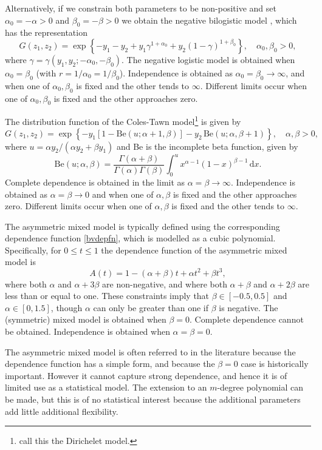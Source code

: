 \documentclass[11pt,a4paper]{article}
\begin{document}
Alternatively, if we constrain both parameters to be non-positive and set $\alpha_0=-\alpha > 0$ and $\beta_0=-\beta > 0$ we obtain the negative bilogistic model \citep{coletawn94}, which has the representation
\begin{equation*}
G(z_1,z_2) = \exp\left\{-y_1-y_2+y_1\gamma^{1+\alpha_0}+y_2(1-\gamma)^{1+\beta_0} \right\}, \quad \alpha_0,\beta_0 > 0,
\end{equation*}
where $\gamma=\gamma(y_1,y_2;-\alpha_0,-\beta_0)$.
The negative logistic model is obtained when $\alpha_0=\beta_0$ (with $r = 1/\alpha_0 = 1/\beta_0$).
Independence is obtained as $\alpha_0 = \beta_0 \rightarrow\infty$, and when one of $\alpha_0,\beta_0$ is fixed and the other tends to $\infty$.
Different limits occur when one of $\alpha_0,\beta_0$ is fixed and the other approaches zero.

The distribution function of the Coles-Tawn model\footnote{\citet{coletawn91} call this the Dirichelet model.}
\citep{coletawn91} is given by
\begin{equation*}
G(z_1,z_2) = \exp\left\{-y_1[1-\text{Be}(u;\alpha+1,\beta)] - y_2\,\text{Be}(u;\alpha,\beta+1) \right\}, \quad \alpha,\beta > 0,
\end{equation*}
where $u=\alpha y_2/(\alpha y_2+\beta y_1)$ and Be is the incomplete beta function, given by
\begin{equation*}
\text{Be}(u;\alpha,\beta) = \frac{\Gamma(\alpha+\beta)}{\Gamma(\alpha)\Gamma(\beta)} \int_0^u x^{\alpha-1}(1-x)^{\beta-1}  \, \text{d}x.
\end{equation*}
Complete dependence is obtained in the limit as $\alpha = \beta \rightarrow\infty$.
Independence is obtained as $\alpha = \beta \rightarrow0$ and when one of $\alpha,\beta$ is fixed and the other approaches zero.
Different limits occur when one of $\alpha,\beta$ is fixed and the other tends to $\infty$.

The asymmetric mixed model \citep{tawn88} is typically defined using the corresponding dependence function \eqref{bvdepfn}, which is modelled as a cubic polynomial. Specifically, for $0 \leq t \leq 1$ the dependence function of the asymmetric mixed model is 
\begin{equation*}
A(t) = 1 - (\alpha + \beta)t + \alpha t^2 + \beta t^3,
\end{equation*}
where both $\alpha$ and $\alpha + 3\beta$ are non-negative, and where both $\alpha + \beta$ and $\alpha + 2\beta$ are less than or equal to one. These constraints imply that $\beta \in [-0.5,0.5]$ and $\alpha \in [0,1.5]$, though $\alpha$ can only be greater than one if $\beta$ is negative. The (symmetric) mixed model is obtained when $\beta = 0$. Complete dependence cannot be obtained. Independence is obtained when $\alpha = \beta = 0$. 

The asymmetric mixed model is often referred to in the literature because the dependence function has a simple form, and because the $\beta = 0$ case is historically important. However it cannot capture strong dependence, and hence it is of limited use as a statistical model. The extension to an $m$-degree polynomial can be made, but this is of no statistical interest because the additional parameters add little additional flexibility.  


\end{document}
